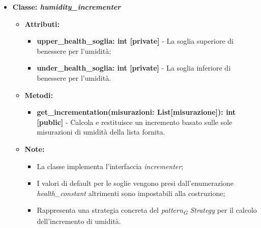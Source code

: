 \begin{itemize}
    \item{\textbf{Classe: \textit{humidity\_incrementer}}}
        \begin{itemize}
            \item\textbf{Attributi:}
            \begin{itemize}
                \item \textbf{upper\_health\_soglia: int [private]} - La soglia superiore di benessere per l'umidità;
                \item \textbf{under\_health\_soglia: int [private]} - La soglia inferiore di benessere per l'umidità.
            \end{itemize}
    \item \textbf{Metodi:}
        \begin{itemize}
            \item \textbf{get\_incrementation(misurazioni: List[misurazione]): int [public]} - Calcola e restituisce un incremento basato sulle sole misurazioni di umidità della lista fornita.
        \end{itemize}
    \item \textbf{Note:}
        \begin{itemize}
            \item La classe implementa l'interfaccia \textit{incrementer};
            \item I valori di default per le soglie vengono presi dall'enumerazione \textit{health\_constant} altrimenti sono impostabili alla costruzione;
            \item Rappresenta una strategia concreta del \textit{pattern}\textsubscript{\textit{G}} \textit{Strategy} per il calcolo dell'incremento di umidità.
        \end{itemize}
    \end{itemize}
    

\end{itemize}
